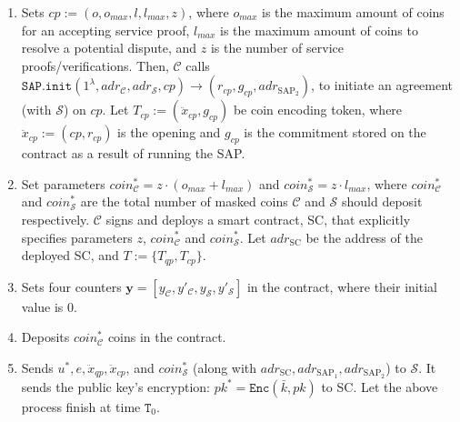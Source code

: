 \begin{enumerate}
\begin{enumerate}
\item  Sets  $cp:=(o,o_{\scriptscriptstyle max},l,l_{\scriptscriptstyle max},z)$, where $o_{\scriptscriptstyle max}$ is the maximum amount of coins  for an accepting service proof,  $l_{\scriptscriptstyle max}$  is the maximum amount of coins to resolve a potential dispute, and $z$ is the number of  service proofs/verifications. Then, $\mathcal C$ calls $\mathtt{SAP.init}(1^{\scriptscriptstyle\lambda}, adr_{\scriptscriptstyle\mathcal{C}}, adr_{\scriptscriptstyle\mathcal{S}},cp )\rightarrow(r_{\scriptscriptstyle cp},g_{\scriptscriptstyle cp},adr_{\scriptscriptstyle\text{SAP}_{\scriptscriptstyle 2}})$, to initiate an agreement (with $\mathcal{S}$) on $cp$. Let $T_{\scriptscriptstyle cp}:=(\ddot{x}_{\scriptscriptstyle cp},g_{\scriptscriptstyle cp})$ be coin encoding token,  where  $\ddot{x}_{\scriptscriptstyle cp}:=(cp,r_{\scriptscriptstyle cp})$ is the opening and $g_{\scriptscriptstyle cp}$ is the commitment stored on the contract as a result of running the  SAP.  

\item Set parameters  $coin^{\scriptscriptstyle *}_{\scriptscriptstyle\mathcal C}=z\cdot (o_{\scriptscriptstyle max}+l_{\scriptscriptstyle max})$ and $coin^{\scriptscriptstyle *}_{\scriptscriptstyle\mathcal S}=z\cdot l_{\scriptscriptstyle max}$, where $coin^{\scriptscriptstyle *}_{\scriptscriptstyle\mathcal C}$ and $coin^{\scriptscriptstyle *}_{\scriptscriptstyle\mathcal S}$ are   the total number of masked coins $\mathcal C$ and $\mathcal S$ should deposit respectively. $\mathcal C$ signs and deploys a smart contract, SC, that explicitly specifies  parameters $z$,  $coin^{\scriptscriptstyle *}_{\scriptscriptstyle\mathcal C}$ and $coin^{\scriptscriptstyle *}_{\scriptscriptstyle\mathcal S}$. Let $adr_{\scriptscriptstyle \text{SC}}$ be the address of the deployed SC, and $T:=\{T_{\scriptscriptstyle qp},T_{\scriptscriptstyle cp}\}$. 

\item Sets four counters $\bm{y}=[y_{\scriptscriptstyle\mathcal C},y'_{\scriptscriptstyle\mathcal C},y_{\scriptscriptstyle\mathcal S}, y'_{\scriptscriptstyle\mathcal S}]$ in the contract, where their initial value is $0$. 

\item Deposits $coin^{\scriptscriptstyle *}_{\scriptscriptstyle\mathcal C}$ coins in the contract.

\item Sends $u^{\scriptscriptstyle *}, e, \ddot{x}_{\scriptscriptstyle qp},\ddot{x}_{\scriptscriptstyle cp}$, and $coin^{\scriptscriptstyle *}_{\scriptscriptstyle\mathcal S}$ (along with $adr_{\scriptscriptstyle \text{SC}}, adr_{\scriptscriptstyle\text{SAP}_{\scriptscriptstyle 1}},adr_{\scriptscriptstyle\text{SAP}_{\scriptscriptstyle 2}}$) to $\mathcal S$. It sends  the public key's encryption: $pk^{\scriptscriptstyle *}=\mathtt{Enc}(\bar{k},pk)$ to SC. Let the above process finish at time $\texttt{T}_{\scriptscriptstyle 0}$. 






\end{enumerate}
\end{enumerate}
